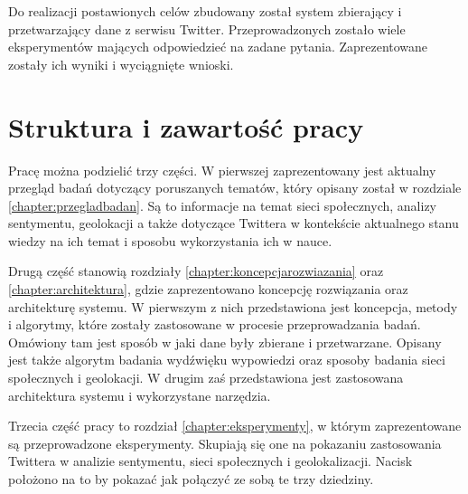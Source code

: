 Do realizacji postawionych celów zbudowany został system
zbierający i przetwarzający dane z serwisu Twitter. Przeprowadzonych zostało
wiele eksperymentów mających odpowiedzieć na zadane pytania. Zaprezentowane
zostały ich wyniki i wyciągnięte wnioski.

\section{Struktura i zawartość pracy}
Pracę można podzielić trzy części. W pierwszej zaprezentowany jest
aktualny przegląd badań dotyczący poruszanych tematów, który
opisany został w rozdziale \ref{chapter:przegladbadan}. Są to 
informacje na temat sieci społecznych, analizy sentymentu, geolokacji
a także dotyczące Twittera w kontekście aktualnego stanu wiedzy na ich temat i
sposobu wykorzystania ich w nauce.

Drugą część stanowią rozdziały \ref{chapter:koncepcjarozwiazania} oraz
\ref{chapter:architektura}, gdzie zaprezentowano koncepcję
rozwiązania oraz architekturę systemu. W pierwszym z nich przedstawiona jest
koncepcja, metody i algorytmy, które zostały zastosowane w procesie
przeprowadzania badań. Omówiony tam jest sposób w jaki dane były
zbierane i przetwarzane. Opisany jest także algorytm badania wydźwięku
wypowiedzi oraz sposoby badania sieci społecznych i geolokacji. W drugim zaś
przedstawiona jest zastosowana architektura systemu i wykorzystane narzędzia.

Trzecia część pracy to rozdział \ref{chapter:eksperymenty}, w którym
zaprezentowane są przeprowadzone eksperymenty. Skupiają się one na pokazaniu
zastosowania Twittera w analizie sentymentu, sieci społecznych i geolokalizacji.
Nacisk położono na to by pokazać jak połączyć ze sobą te trzy dziedziny.

